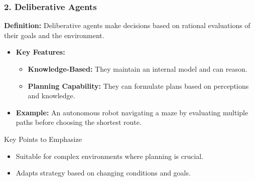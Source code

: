 \documentclass[aspectratio=169]{beamer}
\begin{document}
\begin{frame}[fragile]
    \frametitle{2. Deliberative Agents}
    \textbf{Definition:}  
    Deliberative agents make decisions based on rational evaluations of their goals and the environment.

    \begin{itemize}
        \item \textbf{Key Features:}
        \begin{itemize}
            \item \textbf{Knowledge-Based:} They maintain an internal model and can reason.
            \item \textbf{Planning Capability:} They can formulate plans based on perceptions and knowledge.
        \end{itemize}
        \item \textbf{Example:}
        An autonomous robot navigating a maze by evaluating multiple paths before choosing the shortest route.
    \end{itemize}
    
    \begin{block}{Key Points to Emphasize}
        \begin{itemize}
            \item Suitable for complex environments where planning is crucial.
            \item Adapts strategy based on changing conditions and goals.
        \end{itemize}
    \end{block}
\end{frame}
\end{document}
